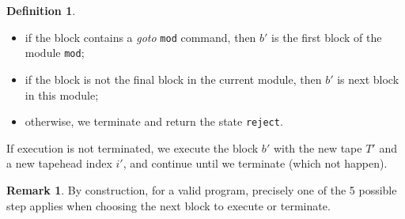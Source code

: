 \documentclass{article}
\theoremstyle{definition}
\newtheorem{definition}[rules]{Definition}
\newtheorem{remark}[rules]{Remark}
\theoremstyle{plain}
\begin{document}
\begin{definition}
\begin{itemize}
\begin{itemize}
                \item if the block contains a \textit{goto} \texttt{mod} command, then $b'$ is the first block of the module \texttt{mod};
                \item if the block is not the final block in the current module, then $b'$ is next block in this module;
                \item otherwise, we terminate and return the state \texttt{reject}.
            \end{itemize}
        \end{itemize}
        If execution is not terminated, we execute the block $b'$ with the new tape $T'$ and a new tapehead index $i'$, and continue until we terminate (which not happen).
    \end{definition}
    \begin{remark}
        By construction, for a valid program, precisely one of the 5 possible step applies when choosing the next block to execute or terminate.
    \end{remark}
    
\end{document}
